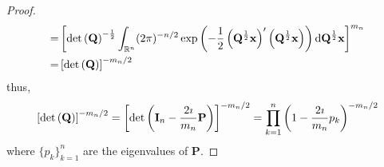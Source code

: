 \begin{proof}
\begin{equation*}
\begin{aligned}
			= & \left[\det\left(\mathbf{Q}\right)^{-\frac{1}{2}}\int_{\mathbb{R}^{n}}(2\pi)^{-n/2}\exp\left(-\frac{1}{2}\left(\mathbf{Q}^{\frac{1}{2}}\mathbf{x}\right)^{\prime}\left(\mathbf{Q}^{\frac{1}{2}}\mathbf{x}\right)\right)\mathop{}\!\mathrm{d}\mathbf{Q}^{\frac{1}{2}}\mathbf{x}\right]^{m_{n}} \\
			= & \left[\det\left(\mathbf{Q}\right)\right]^{-m_{n}/2}
		\end{aligned}
	\end{equation*}
	thus,
	\begin{equation}
		\left[\det\left(\mathbf{Q}\right)\right]^{-m_{n}/2}=\left[\det\left(\mathbf{I}_{n}-\frac{2\imath}{m_{n}}\mathbf{P}\right)\right]^{-m_{n}/2}=\prod_{k=1}^{n}\left(1-\frac{2\imath}{m_n}p_{k}\right)^{-m_{n}/2}
		\label{eq:characteristic-function-wishart-result-1}
	\end{equation}
	where \(\{p_{k}\}_{k=1}^{n}\) are the eigenvalues of \(\mathbf{P}\).


\end{proof}
